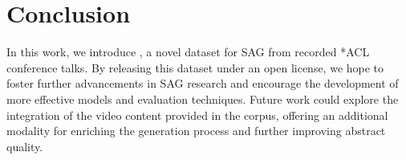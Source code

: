 \section{Conclusion}\label{sec:conclusion}
In this work, we introduce \DATASETNAME{}, a novel dataset for SAG from recorded *ACL conference talks. By releasing this dataset under an open license, we hope to foster further advancements in SAG research and encourage the development of more effective models and evaluation techniques. 
Future work could explore the integration of the video content provided in the corpus, offering an additional modality for enriching the generation process and further improving abstract quality.